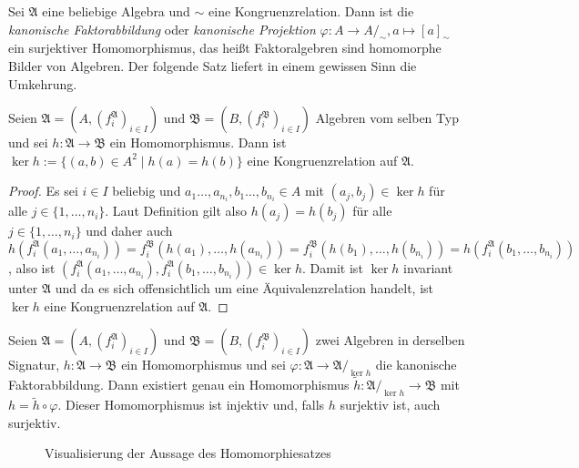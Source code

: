 \begin{remark}
    Sei $\mathfrak{A}$ eine beliebige Algebra und $\sim$ eine Kongruenzrelation. Dann ist die \emph{kanonische Faktorabbildung} oder \emph{kanonische Projektion}
    $\varphi:A\to A/_\sim, a\mapsto [a]_\sim$ ein surjektiver Homomorphismus, das heißt
    Faktoralgebren sind homomorphe Bilder von Algebren. Der folgende Satz liefert in einem gewissen Sinn die Umkehrung.
\end{remark}

\begin{lemma}
    Seien $\mathfrak{A}=(A,(f^\mathfrak{A}_i)_{i\in I})$ und $\mathfrak{B}=(B,(f^\mathfrak{B}_i)_{i\in I})$ Algebren vom selben Typ
    und sei $h:\mathfrak{A}\to \mathfrak{B}$ ein Homomorphismus. Dann ist $\ker h:=\{(a,b)\in A^2\mid h(a)=h(b)\}$ eine Kongruenzrelation auf $\mathfrak{A}$.
\end{lemma}

\begin{proof}
    Es sei $i\in I$ beliebig und $a_1\ldots,a_{n_i},b_1\ldots,b_{n_i}\in A$ mit $(a_j,b_j)\in \ker h$ für alle $j\in \{1,\ldots,n_i\}$.
    Laut Definition gilt also $h(a_j)=h(b_j)$ für alle $j\in\{1,\ldots,n_i\}$ und daher auch
    $h(f^\mathfrak{A}_i(a_1,\ldots,a_{n_i}))=f^\mathfrak{B}_i(h(a_1),\ldots,h(a_{n_i}))=f^\mathfrak{B}_i(h(b_1),\ldots,h(b_{n_i}))=h(f^\mathfrak{A}_i(b_1,\ldots,b_{n_i}))$,
    also ist $(f^\mathfrak{A}_i(a_1,\ldots,a_{n_i}),f^\mathfrak{A}_i(b_1,\ldots,b_{n_i}))\in\ker h$. Damit ist $\ker h$ invariant unter $\mathfrak{A}$
    und da es sich offensichtlich um eine Äquivalenzrelation handelt, ist $\ker h$ eine Kongruenzrelation auf $\mathfrak{A}$.
\end{proof}

\begin{theorem}[Homomorphiesatz]\label{satz:homomorphiesatz}
    Seien $\mathfrak{A}=(A,(f^\mathfrak{A}_i)_{i\in I})$ und $\mathfrak{B}=(B,(f^\mathfrak{B}_i)_{i\in I})$ zwei Algebren
    in derselben Signatur, $h:\mathfrak{A}\to \mathfrak{B}$ ein Homomorphismus und sei $\varphi:\mathfrak{A}\to \mathfrak{A}/_{\ker h}$ die kanonische Faktorabbildung.
    Dann existiert genau ein Homomorphismus $\tilde{h}:\mathfrak{A}/_{\ker h}\to \mathfrak{B}$ mit $h=\tilde{h}\circ \varphi$. Dieser Homomorphismus
    ist injektiv und, falls $h$ surjektiv ist, auch surjektiv.
    \begin{figure}[H]
        \centering
        \caption{Visualisierung der Aussage des Homomorphiesatzes}
    \end{figure}
\end{theorem}

